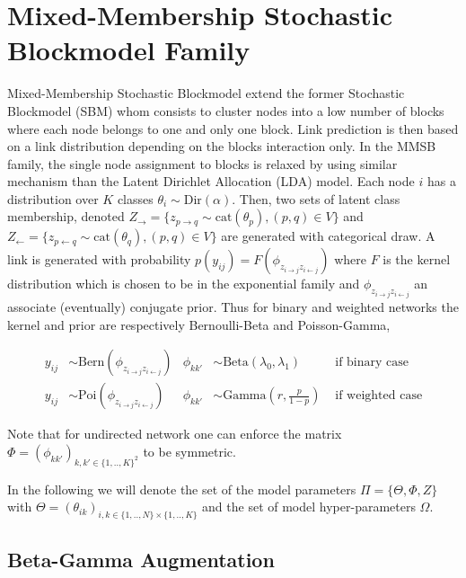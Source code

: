 \section{Mixed-Membership Stochastic Blockmodel Family}

Mixed-Membership Stochastic Blockmodel extend the former Stochastic Blockmodel (SBM) \cite{airoldi2009mixed} whom consists to cluster nodes into a low number of blocks where each node belongs to one and only one block. Link prediction is then based on a link distribution depending on the blocks interaction only. %
In the MMSB family, the single node assignment to blocks is relaxed by using similar mechanism than the Latent Dirichlet Allocation (LDA) model. Each node $i$ has a distribution over $K$ classes $\theta_i \sim \textrm{Dir}(\alpha)$. Then, two sets of latent class membership, denoted $Z_\rightarrow = \{z_{p\rightarrow q} \sim \textrm{cat}(\theta_p),  (p,q) \in V\}$ and $Z_\leftarrow = \{z_{p\leftarrow q} \sim \textrm{cat}(\theta_q),  (p,q) \in V\}$ are generated with categorical draw. A link is generated with probability $p(y_{ij}) = F(\phi_{z_{i \rightarrow j}z_{i \leftarrow j}})$ where $F$ is the kernel distribution which is chosen to be in the exponential family and $\phi_{z_{i \rightarrow j}z_{i \leftarrow j}}$ an associate (eventually) conjugate prior. Thus for binary and weighted networks the kernel and prior are respectively Bernoulli-Beta and Poisson-Gamma,

\begin{align*} \label{eq:generative}
y_{ij} &\sim \textrm{Bern}(\phi_{z_{i \rightarrow j}z_{i \leftarrow j}}) & \phi_{kk'} &\sim \textrm{Beta}(\lambda_0, \lambda_1) & \textrm{ if binary case} \\
y_{ij} &\sim \textrm{Poi}(\phi_{z_{i \rightarrow j}z_{i \leftarrow j}}) &  \phi_{kk'} &\sim \textrm{Gamma}(r, \frac{p}{1-p})    & \textrm{ if weighted case} 
\end{align*}

Note that for undirected network one can enforce the matrix $\Phi = (\phi_{kk'})_{k,k' \in \{1,..,K\}^2}$ to be symmetric.

In the following we will denote the set of the model parameters $\Pi = \{ \Theta, \Phi, Z \}$ with $\Theta = (\theta_{ik})_{i,k \in \{1,..,N\}\times \{1,..,K\}}$ and the set of model hyper-parameters $\Omega$.

\subsection{Beta-Gamma Augmentation}

